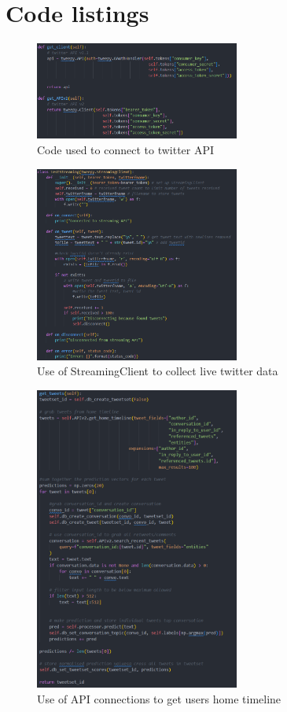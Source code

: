 \chapter{Code listings}\label{app:code}
\begin{figure}[hbtp]
    \centering
    \includegraphics[width=0.6\textwidth]{../images/setup-api-conn.png}
    \caption{Code used to connect to twitter API}
    \label{fig:tweepy-conn}
\end{figure}
\begin{figure}[hbtp]
    \centering
    \includegraphics[width=0.6\textwidth]{../images/streamingclient.png}
    \caption{Use of StreamingClient to collect live twitter data}
    \label{fig:live-data}
\end{figure}
\begin{figure}[hbtp]
    \centering
    \includegraphics[width=0.6\textwidth]{../images/get_home_timeline.png}
    \caption{Use of API connections to get users home timeline}
    \label{fig:user-data}
\end{figure}